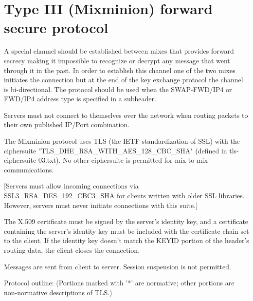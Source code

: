 \section{Type III (Mixminion) forward secure protocol}

A special channel should be established between mixes that provides
forward secrecy making it impossible to recognize or decrypt any
message that went through it in the past. In order to establish this
channel one of the two mixes initiates the connection but at the end
of the key exchange protocol the channel is bi-directional. The
protocol should be used when the SWAP-FWD/IP4 or FWD/IP4 address type
is specified in a subheader.

Servers must not connect to themselves over the network when routing
packets to their own published IP/Port combination.

The Mixminion protocol uses TLS (the IETF standardization of SSL) with
the ciphersuite "TLS_DHE_RSA_WITH_AES_128_CBC_SHA" (defined in
tls-ciphersuite-03.txt).  No other ciphersuite is permitted for
mix-to-mix communications.

[Servers must allow incoming connections via SSL3_RSA_DES_192_CBC3_SHA
for clients written with older SSL libraries.  However, servers must
never initiate connections with this suite.]

The X.509 certificate must be signed by the server's identity
key, and a certificate containing the server's identity key must be
included with the certificate chain set to the client.  If the
identity key doesn't match the KEYID portion of the  header's routing
data, the client closes the connection.

Messages are sent from client to server.  Session suspension is not
permitted.

Protocol outline: (Portions marked with '*' are normative; other
portions are non-normative descriptions of TLS.)

